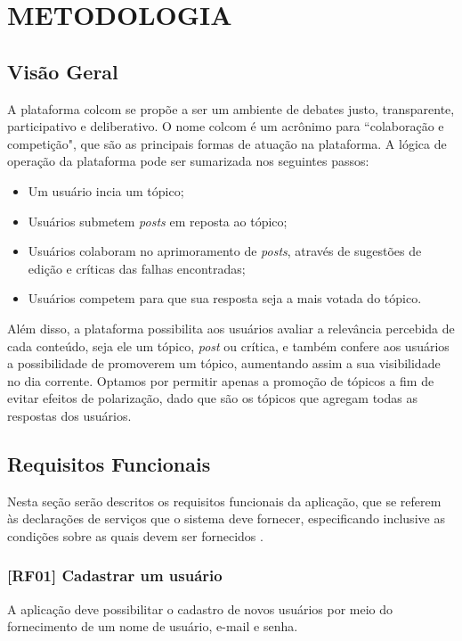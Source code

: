 \section{METODOLOGIA}
\subsection{Visão Geral}
A plataforma colcom se propõe a ser um ambiente de debates justo, transparente, participativo e deliberativo. O nome colcom é um acrônimo para “colaboração e competição", que são as principais formas de atuação na plataforma. A lógica de operação da plataforma pode ser sumarizada nos seguintes passos:

\begin{itemize}
    \item Um usuário incia um tópico;
    \item Usuários submetem \textit{posts} em reposta ao tópico;
    \item Usuários colaboram no aprimoramento de \textit{posts}, através de sugestões de edição e críticas das falhas encontradas;
    \item Usuários competem para que sua resposta seja a mais votada do tópico.
\end{itemize}

Além disso, a plataforma possibilita aos usuários avaliar a relevância percebida de cada conteúdo, seja ele um tópico, \textit{post} ou crítica, e também confere aos usuários a possibilidade de promoverem um tópico, aumentando assim a sua visibilidade no dia corrente. Optamos por permitir apenas a promoção de tópicos a fim de evitar efeitos de polarização, dado que são os tópicos que agregam todas as respostas dos usuários.




\subsection{Requisitos Funcionais}

Nesta seção serão descritos os requisitos funcionais da aplicação, que se referem às declarações de serviços que o sistema deve fornecer, especificando inclusive as condições sobre as quais devem ser fornecidos \cite{requirements}.

\subsubsection{[RF01] Cadastrar um usuário}
A aplicação deve possibilitar o cadastro de novos usuários por meio do fornecimento de um nome de usuário, e-mail e senha.

